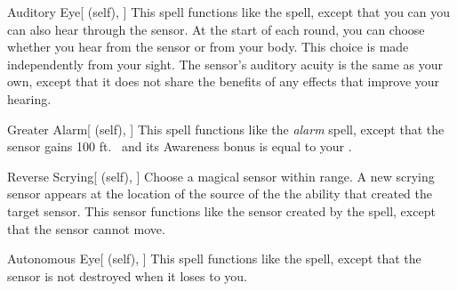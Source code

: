 \lowercase{\hypertarget{spell:Auditory Eye}{}}\label{spell:Auditory Eye}
\begin{attuneability}[\nth{2}]{\hypertarget{spell:Auditory Eye}{Auditory Eye}}[ (self), ]
This spell functions like the  spell, except that you can you can also hear through the sensor.
At the start of each round, you can choose whether you hear from the sensor or from your body.
This choice is made independently from your sight.
The sensor's auditory acuity is the same as your own, except that it does not share the benefits of any  effects that improve your hearing.
\end{attuneability}
\vspace{0.25em}



\lowercase{\hypertarget{spell:Greater Alarm}{}}\label{spell:Greater Alarm}
\begin{attuneability}[\nth{2}]{\hypertarget{spell:Greater Alarm}{Greater Alarm}}[ (self), ]
This spell functions like the \textit{alarm} spell, except that the sensor gains 100 ft.\  and its Awareness bonus is equal to your .
\end{attuneability}
\vspace{0.25em}



\lowercase{\hypertarget{spell:Reverse Scrying}{}}\label{spell:Reverse Scrying}
\begin{attuneability}[\nth{2}]{\hypertarget{spell:Reverse Scrying}{Reverse Scrying}}[ (self), ]
Choose a magical sensor within \rngmed range.
A new scrying sensor appears at the location of the source of the the ability that created the target sensor.
This sensor functions like the sensor created by the  spell, except that the sensor cannot move.
\end{attuneability}
\vspace{0.25em}



\lowercase{\hypertarget{spell:Autonomous Eye}{}}\label{spell:Autonomous Eye}
\begin{attuneability}[\nth{3}]{\hypertarget{spell:Autonomous Eye}{Autonomous Eye}}[ (self), ]
This spell functions like the  spell, except that the sensor is not destroyed when it loses  to you.
\end{attuneability}
\vspace{0.25em}



